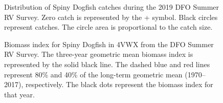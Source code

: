 \documentclass[11pt]{book}
\begin{document}
\begin{figure}[htb]

{\centering {} 

}

\caption{Distribution of Spiny Dogfish catches during the 2019 DFO Summer RV Survey. Zero catch is represented by the + symbol. Black circles represent catches. The circle area is proportional to the catch size.}\label{fig:105-map-dogfish}
\end{figure}

\begin{figure}[htb]

{\centering {} 

}

\caption{Biomass index for Spiny Dogfish in 4VWX from the DFO Summer RV Survey. The three-year geometric mean biomass index is represented by the solid black line. The dashed blue and red lines represent 80\% and 40\% of the long-term geometric mean (1970--2017), respectively. The black dots represent the biomass index for that year.}\label{fig:106-fig-dogfish-biomass}
\end{figure}
\end{document}
